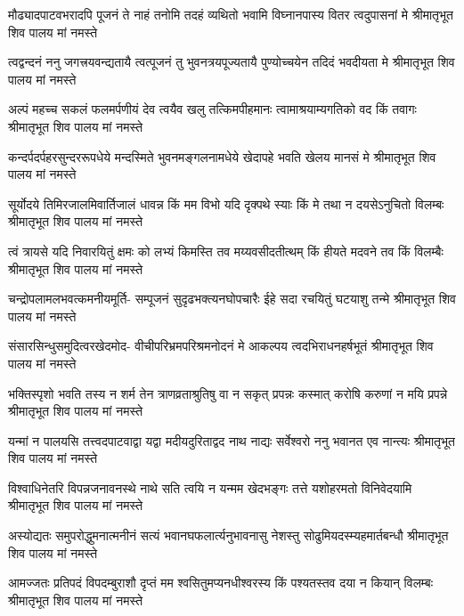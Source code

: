 \fourlineindentedshloka
{मौढ्यादपाटवभरादपि पूजनं ते}
{नाहं तनोमि तदहं व्यथितो भवामि}
{विघ्नानपास्य वितर त्वदुपासनां मे}
{श्रीमातृभूत शिव पालय मां नमस्ते} %

\fourlineindentedshloka
{त्वद्वन्दनं ननु जगत्त्रयवन्द्यतायै}
{त्वत्पूजनं तु भुवनत्रयपूज्यतायै}
{पुण्योच्चयेन तदिदं भवदीयता मे}
{श्रीमातृभूत शिव पालय मां नमस्ते} %

\fourlineindentedshloka
{अल्पं महच्च सकलं फलमर्पणीयं}
{देव त्वयैव खलु तत्किमपीहमानः}
{त्वामाश्रयाम्यगतिको वद किं तवागः}
{श्रीमातृभूत शिव पालय मां नमस्ते} %

\fourlineindentedshloka
{कन्दर्पदर्पहरसुन्दररूपधेये}
{मन्दस्मिते भुवनमङ्गलनामधेये}
{खेदापहे भवति खेलय मानसं मे}
{श्रीमातृभूत शिव पालय मां नमस्ते} %

\fourlineindentedshloka
{सूर्योदये तिमिरजालमिवार्तिजालं}
{धावन्न किं मम विभो यदि दृक्पथे स्याः}
{किं मे तथा न दयसेऽनुचितो विलम्बः}
{श्रीमातृभूत शिव पालय मां नमस्ते} %

\fourlineindentedshloka
{त्वं त्रायसे यदि निवारयितुं क्षमः को}
{लभ्यं किमस्ति तव मय्यवसीदतीत्थम्}
{किं हीयते मदवने तव किं विलम्बैः}
{श्रीमातृभूत शिव पालय मां नमस्ते} %

\fourlineindentedshloka
{चन्द्रोपलामलभवत्कमनीयमूर्ति-}
{सम्पूजनं सुदृढभक्त्यनघोपचारैः}
{ईहे सदा रचयितुं घटयाशु तन्मे}
{श्रीमातृभूत शिव पालय मां नमस्ते} %

\fourlineindentedshloka
{संसारसिन्धुसमुदित्वरखेदमोद-}
{वीचीपरिभ्रमपरिश्रमनोदनं मे}
{आकल्पय त्वदभिराधनहर्षभूतं}
{श्रीमातृभूत शिव पालय मां नमस्ते} %

\fourlineindentedshloka
{भक्तिस्पृशो भवति तस्य न शर्म तेन}
{त्राणव्रताश्रुतिषु वा न सकृत् प्रपन्नः}
{कस्मात् करोषि करुणां न मयि प्रपन्ने}
{श्रीमातृभूत शिव पालय मां नमस्ते} %

\fourlineindentedshloka
{यन्मां न पालयसि तत्त्वदपाटवाद्वा}
{यद्वा मदीयदुरिताद्वद नाथ नाद्यः}
{सर्वेश्वरो ननु भवानत एव नान्त्यः}
{श्रीमातृभूत शिव पालय मां नमस्ते} %

\fourlineindentedshloka
{विश्वाधिनेतरि विपन्नजनावनस्थे}
{नाथे सति त्वयि न यन्मम खेदभङ्गः}
{तत्ते यशोहरमतो विनिवेदयामि}
{श्रीमातृभूत शिव पालय मां नमस्ते} %

\fourlineindentedshloka
{अस्योद्यतः समुपरोद्धुमनात्मनीनं}
{सत्यं भवानघफलार्त्यनुभावनासु}
{नेशस्तु सोढुमियदस्म्यहमार्तबन्धौ}
{श्रीमातृभूत शिव पालय मां नमस्ते} %

\fourlineindentedshloka
{आमज्जतः प्रतिपदं विपदम्बुराशौ}
{दृप्तं मम श्वसितुमप्यनधीश्वरस्य}
{किं पश्यतस्तव दया न कियान् विलम्बः}
{श्रीमातृभूत शिव पालय मां नमस्ते} %

